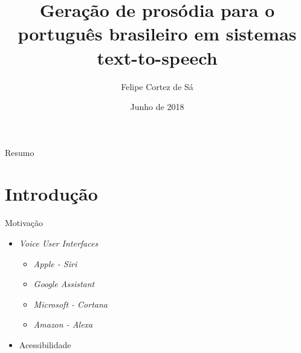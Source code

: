 \documentclass{beamer}
\title[Geração de prosódia]{Geração de prosódia para o português brasileiro em sistemas text-to-speech}
\author{Felipe Cortez de Sá}
\date{Junho de 2018}
\institute[UFRN]{Universidade Federal do Rio Grande do Norte}
\begin{document}
\begin{frame}
  \titlepage
\end{frame}

\begin{frame}{Resumo}
  \tableofcontents
\end{frame}

\section{Introdução}
\begin{frame}{Motivação}
  \begin{itemize}
    \item \emph{Voice User Interfaces}
        \begin{itemize}
            \item \emph{Apple - Siri}
            \item \emph{Google Assistant}
            \item \emph{Microsoft - Cortana}
            \item \emph{Amazon - Alexa}
        \end{itemize}
    \item Acessibilidade
  \end{itemize}
\end{frame}
\end{document}
